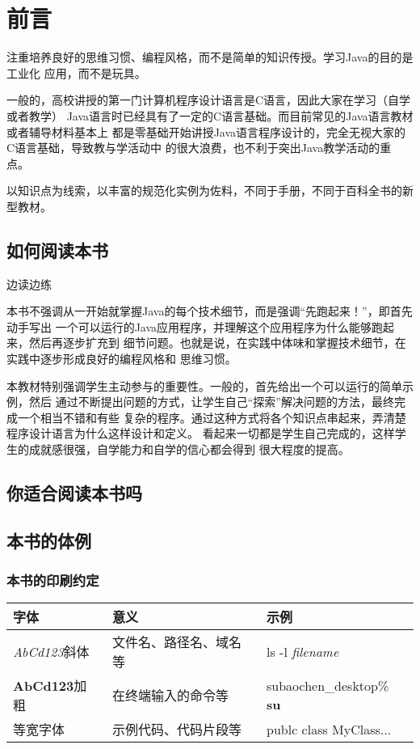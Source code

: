 \frontmatter
\chapter{前言}
注重培养良好的思维习惯、编程风格，而不是简单的知识传授。学习Java的目的是工业化
应用，而不是玩具。

一般的，高校讲授的第一门计算机程序设计语言是C语言，因此大家在学习（自学或者教学）
Java语言时已经具有了一定的C语言基础。而目前常见的Java语言教材或者辅导材料基本上
都是零基础开始讲授Java语言程序设计的，完全无视大家的C语言基础，导致教与学活动中
的很大浪费，也不利于突出Java教学活动的重点。

以知识点为线索，以丰富的规范化实例为佐料，不同于手册，不同于百科全书的新型教材。

\section*{如何阅读本书}
边读边练

本书不强调从一开始就掌握Java的每个技术细节，而是强调“先跑起来！”，即首先动手写出
一个可以运行的Java应用程序，并理解这个应用程序为什么能够跑起来，然后再逐步扩充到
细节问题。也就是说，在实践中体味和掌握技术细节，在实践中逐步形成良好的编程风格和
思维习惯。

本教材特别强调学生主动参与的重要性。一般的，首先给出一个可以运行的简单示例，然后
通过不断提出问题的方式，让学生自己“探索”解决问题的方法，最终完成一个相当不错和有些
复杂的程序。通过这种方式将各个知识点串起来，弄清楚程序设计语言为什么这样设计和定义。
看起来一切都是学生自己完成的，这样学生的成就感很强，自学能力和自学的信心都会得到
很大程度的提高。

\section*{你适合阅读本书吗}
\section*{本书的体例}
\subsection*{本书的印刷约定}
\begin{tabular}{|l|l|l|}
    \hline
    字体 & 意义 & 示例 \\
    \hline
    \textsl{AbCd123}斜体 & 文件名、路径名、域名等 & ls -l \textsl{filename}\\
    \hline
    \textbf{AbCd123}加粗 & 在终端输入的命令等 & subaochen\_desktop\% \textbf{su} \\
    \hline
    等宽字体 & 示例代码、代码片段等 & publc class MyClass... \\
    \hline

\end{tabular}

